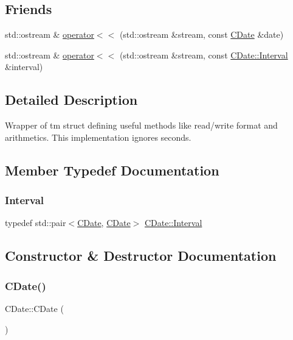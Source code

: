 \subsection*{Friends}
\begin{DoxyCompactItemize}
\item 
std\+::ostream \& \mbox{\hyperlink{class_c_date_a6101b1c471c7790dcb75f5746f719c5f}{operator$<$$<$}} (std\+::ostream \&stream, const \mbox{\hyperlink{class_c_date}{C\+Date}} \&date)
\item 
std\+::ostream \& \mbox{\hyperlink{class_c_date_a4414c2f98725d7b2865080c5edc7ab62}{operator$<$$<$}} (std\+::ostream \&stream, const \mbox{\hyperlink{class_c_date_af23472c977b14ed341b48183ec19d874}{C\+Date\+::\+Interval}} \&interval)
\end{DoxyCompactItemize}


\subsection{Detailed Description}
Wrapper of tm struct defining useful methods like read/write format and arithmetics. This implementation ignores seconds. 

\subsection{Member Typedef Documentation}
\mbox{\label{class_c_date_af23472c977b14ed341b48183ec19d874}} 
\subsubsection{\texorpdfstring{Interval}{Interval}}
{\footnotesize\ttfamily typedef std\+::pair$<$\mbox{\hyperlink{class_c_date}{C\+Date}}, \mbox{\hyperlink{class_c_date}{C\+Date}}$>$ \mbox{\hyperlink{class_c_date_af23472c977b14ed341b48183ec19d874}{C\+Date\+::\+Interval}}}



\subsection{Constructor \& Destructor Documentation}
\mbox{\label{class_c_date_abaab9d809338418c9a749ce479fcea61}} 
\subsubsection{\texorpdfstring{C\+Date()}{CDate()}\hspace{0.1cm}{\footnotesize\ttfamily [1/4]}}
{\footnotesize\ttfamily C\+Date\+::\+C\+Date (\begin{DoxyParamCaption}{ }\end{DoxyParamCaption})}

